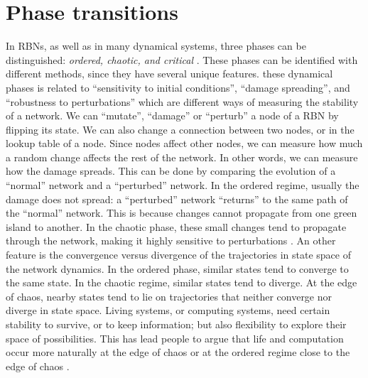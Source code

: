 \section{Phase transitions}
In RBNs, as well as in many dynamical systems, three
phases can be distinguished: \emph{ordered, chaotic, and critical} \cite{K19}.
These phases can be identified with different methods, since
they have several unique features.
these dynamical phases is related to
“sensitivity to initial conditions”, “damage spreading”, and
“robustness to perturbations” which are different ways of
measuring the stability of a network. We can “mutate”,
“damage” or “perturb” a node of a RBN by flipping its state.
We can also change a connection between two nodes, or in
the lookup table of a node. Since nodes affect other nodes,
we can measure how much a random change affects the rest
of the network. In other words, we can measure how the
damage spreads. This can be done by comparing the evolution of a “normal” network and a “perturbed” network. In
the ordered regime, usually the damage does not spread: a
“perturbed” network “returns” to the same path of the “normal” network. This is because changes cannot propagate
from one green island to another. In the chaotic phase, these
small changes tend to propagate through the network, making it highly sensitive to perturbations \cite{K49}.
An other feature is the convergence versus divergence of the
trajectories in state space of the network dynamics. In the ordered phase, similar states tend to converge to the same state.
In the chaotic regime, similar states tend to diverge. At the
edge of chaos, nearby states tend to lie on trajectories that
neither converge nor diverge in state space.
Living systems, or computing systems, need certain stability to survive, or to keep information; but also flexibility
to explore their space of possibilities. This has lead people
to argue that life and computation occur more naturally at
the edge of chaos or at the ordered regime
close to the edge of chaos \cite{K6}\cite{K49}.
